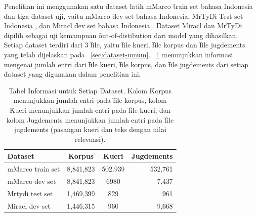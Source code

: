 Penelitian ini menggunakan satu \f{dataset} latih mMarco \f{train set} bahasa Indonesia \citep{mmarco} dan tiga \f{dataset} uji, yaitu mMarco \f{dev set} bahasa Indonesia, MrTyDi Test set Indonesia \citep{mrtydi}, dan Miracl \f{dev set} bahasa Indonesia \citep{miracl}. \f{Dataset} Miracl dan MrTyDi dipilih sebagai uji kemampuan \f{out-of-distibution} dari model yang dihasilkan. Setiap \f{dataset} terdiri dari 3 \f{file}, yaitu \f{file} kueri, \f{file} korpus dan \f{file jugdements} yang telah dijelaskan pada \sect~\ref{sec:dataset-umum}. \tab~\ref{tab:dataset-info} menunjukkan informasi mengenai jumlah entri dari \f{file} kueri, \f{file} korpus, dan \f{file jugdements} dari setiap \f{dataset} yang digunakan dalam penelitian ini.
\begin{table}
    \centering
    \caption{Tabel Informasi untuk Setiap \f{Dataset}. Kolom \f{Korpus} menunjukkan jumlah entri pada \f{file korpus}, kolom \f{Kueri} menunjukkan jumlah entri pada \f{file kueri}, dan kolom \f{Jugdements} menunjukkan jumlah entri pada \f{file jugdements} (pasangan kueri dan teks dengan nilai relevansi).}
    \label{tab:dataset-info}
    \begin{tabular}{|l|c|c|r|} \hline
        \textbf{Dataset} & \textbf{Korpus} & \textbf{Kueri} & \textbf{Jugdements} \\ \hline
        mMarco train set & 8,841,823       & 502.939        & 532,761             \\ \hline
        mMarco dev set   & 8,841,823       & 6980           & 7,437               \\ \hline
        Mrtydi test set  & 1,469,399       & 829            & 961                 \\ \hline
        Miracl dev set   & 1,446,315       & 960            & 9,668               \\ \hline
    \end{tabular}
\end{table}

